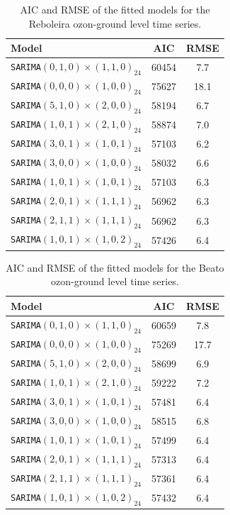\documentclass{article}
\begin{document}
\begin{table}[ht!]
    \centering
    \begin{tabular}{|l|c|c|} \hline
    \textbf{Model} & \textbf{AIC} & \textbf{RMSE} \\ \hline
    \verb|SARIMA|$(0,1,0) \times (1,1,0)_{24}$ & 60454 & 7.7 \\ \hline
    \verb|SARIMA|$(0,0,0) \times (1,0,0)_{24}$ & 75627 & 18.1 \\ \hline
    \verb|SARIMA|$(5,1,0) \times (2,0,0)_{24}$ & 58194 & 6.7 \\ \hline
    \verb|SARIMA|$(1,0,1) \times (2,1,0)_{24}$ & 58874 & 7.0 \\ \hline
    \verb|SARIMA|$(3,0,1) \times (1,0,1)_{24}$ & 57103 & 6.2 \\ \hline
    \verb|SARIMA|$(3,0,0) \times (1,0,0)_{24}$ & 58032 & 6.6 \\ \hline
    \verb|SARIMA|$(1,0,1) \times (1,0,1)_{24}$ & 57103 & 6.3 \\ \hline
    \verb|SARIMA|$(2,0,1) \times (1,1,1)_{24}$ & 56962 & 6.3 \\ \hline 
    \verb|SARIMA|$(2,1,1) \times (1,1,1)_{24}$ & 56962 & 6.3 \\ \hline 
    \verb|SARIMA|$(1,0,1) \times (1,0,2)_{24}$ & 57426 & 6.4 \\ \hline
    \end{tabular}
    \caption{AIC and RMSE of the fitted models for the Reboleira ozon-ground level time series.}
    \label{tab:Reboleira}
\end{table}

\begin{table}[ht!]
    \centering
    \begin{tabular}{|l|c|c|}
     \hline
    \textbf{Model} & \textbf{AIC} & \textbf{RMSE} \\ \hline
    \verb|SARIMA|$(0,1,0) \times (1,1,0)_{24}$ & 60659 & 7.8 \\ \hline
    \verb|SARIMA|$(0,0,0) \times (1,0,0)_{24}$ & 75269 & 17.7  \\ \hline
    \verb|SARIMA|$(5,1,0) \times (2,0,0)_{24}$ & 58699 & 6.9 \\ \hline
    \verb|SARIMA|$(1,0,1) \times (2,1,0)_{24}$ & 59222 & 7.2 \\ \hline
    \verb|SARIMA|$(3,0,1) \times (1,0,1)_{24}$ & 57481 & 6.4 \\ \hline
    \verb|SARIMA|$(3,0,0) \times (1,0,0)_{24}$ & 58515 & 6.8 \\ \hline
    \verb|SARIMA|$(1,0,1) \times (1,0,1)_{24}$ & 57499 & 6.4 \\ \hline
    \verb|SARIMA|$(2,0,1) \times (1,1,1)_{24}$ & 57313 & 6.4 \\ \hline
    \verb|SARIMA|$(2,1,1) \times (1,1,1)_{24}$ & 57361 & 6.4 \\ \hline
    \verb|SARIMA|$(1,0,1) \times (1,0,2)_{24}$ & 57432 & 6.4 \\ \hline
    \end{tabular}
    \caption{AIC and RMSE of the fitted models for the Beato ozon-ground level time series.}
    \label{tab:Beato}
\end{table}
\end{document}
